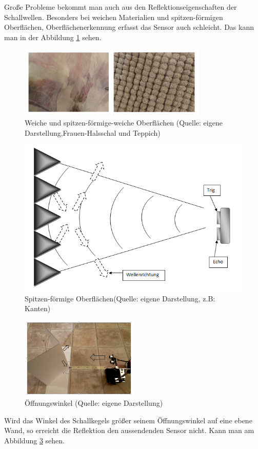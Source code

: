 Große Probleme bekommt man auch aus den Reflektionseigenschaften der Schallwellen. Besonders bei weichen Materialien und spitzen-förmigen Oberflächen, Oberflächenerkennung erfasst das Sensor auch schleicht. Das kann man in der Abbildung \ref{bild_4} sehen.
\begin{figure}[!h]  %
	\centering\includegraphics[width=0.8\textwidth]{images/Bild-4-5.png}
	\caption{Weiche und spitzen-förmige-weiche Oberflächen \newline(Quelle: eigene Darstellung,Frauen-Halsschal und Teppich)}
	\label{bild_4}
\end{figure}
\begin{figure}[!h]  %
	\centering\includegraphics[width=0.\textwidth]{images/Bild-6.png}
	\caption{Spitzen-förmige Oberflächen\newline(Quelle: eigene Darstellung, z.B: Kanten)}
	\label{bild_6}
\end{figure}
\begin{figure}[!h]  %
	\centering\includegraphics[width=0.5\textwidth]{images/Bild-7.png}
	\caption{Öffnungswinkel (Quelle: eigene Darstellung)}
	\label{bild_7} %
\end{figure}
Wird das Winkel des Schallkegels größer seinem Öffnungswinkel auf eine ebene Wand, so erreicht die Reflektion den aussendenden Sensor nicht. Kann man am Abbildung \ref{bild_7} sehen.

